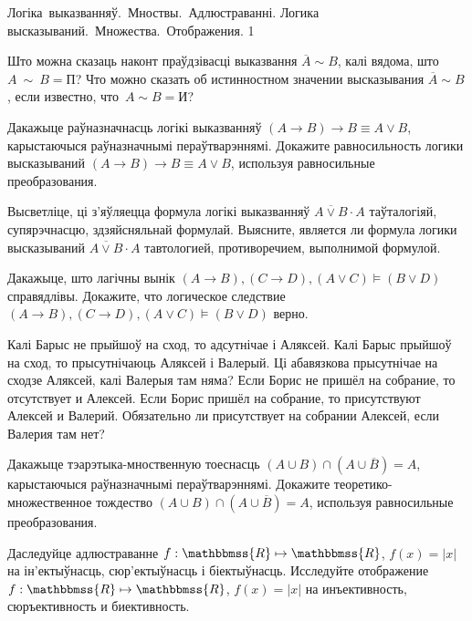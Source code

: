 \documentclass[12pt, a4paper]{article}
\begin{document}
\quizTitle
{Логіка~выказванняў.~Мноствы.~Адлюстраванні.}
{Логика высказываний.~Множества.~Отображения.}
{1}

\begin{problemList}

\problemItemSimple
{Што можна сказаць наконт праўдзівасці выказвання $\overline{A} \sim B$, калі вядома, што~$A~\sim~B = \mbox{П}$?}
{Что можно сказать об истинностном значении высказывания $\overline{A} \sim B$, если известно, что~$A \sim B = \mbox{И}$?}

\bigskip

\problemItemSimple
{Дакажыце раўназначнасць логікі выказванняў $(A \to B) \to B \equiv A \vee B$, карыстаючыся раўназначнымі пераўтварэннямі.}
{Докажите равносильность логики высказываний $(A \to B) \to B \equiv A \vee B$, используя равносильные преобразования.}

\bigskip

\problemItemSimple
{Высветліце, ці з'яўляецца формула логікі выказванняў $\overline{A \vee B} \cdot A$ таўталогіяй, супярэчнасцю, здзяйсняльнай формулай.}
{Выясните, является ли формула логики высказываний $\overline{A \vee B} \cdot A$ тавтологией, противоречием, выполнимой формулой.}

\bigskip

\problemItemSimple
{Дакажыце, што лагічны вынік $(A \to B), (C \to D), (A \vee C) \models (B \vee D)$ справядлівы.}
{Докажите, что логическое следствие $(A \to B), (C \to D), (A \vee C) \models (B \vee D)$ верно.}

\bigskip

\problemItemSimple
{Калі Барыс не прыйшоў на сход, то адсутнічае і Аляксей. Калі Барыс прыйшоў на сход, то прысутнічаюць Аляксей і Валерый.
Ці абавязкова прысутнічае на сходзе Аляксей, калі Валерыя там няма?}
{Если Борис не пришёл на собрание, то отсутствует и Алексей. Если Борис пришёл на собрание, то присутствуют Алексей и Валерий.
Обязательно ли присутствует на собрании Алексей, если Валерия там нет?}

\bigskip

\problemItemSimple
{Дакажыце тэарэтыка-мноственную тоеснасць $(A \cup B) \cap (A \cup \overline{B}) = A$, карыстаючыся раўназначнымі пераўтварэннямі.}
{Докажите теоретико-множественное тождество $(A \cup B) \cap (A \cup \overline{B}) = A$, используя равносильные преобразования.}

\bigskip

\problemItemSimple
{Даследуйце адлюстраванне $f: \mathbbmss{R} \mapsto \mathbbmss{R}$, $f(x) = |x|$ на ін'ектыўнасць, сюр'ектыўнасць і біектыўнасць. }
{Исследуйте отображение $f: \mathbbmss{R} \mapsto \mathbbmss{R}$, $f(x) = |x|$ на инъективность, сюръективность и биективность.}


\end{problemList}
\end{document}
